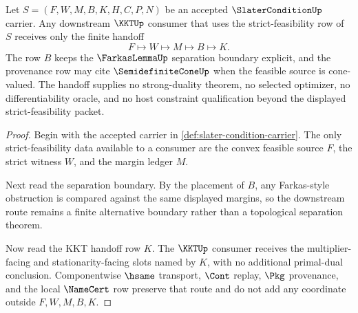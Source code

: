 \begin{theorem}
\label{thm:slater-condition-kkt-handoff}
Let $S=(F,W,M,B,K,H,C,P,N)$ be an accepted $\SlaterConditionUp$ carrier. Any downstream $\KKTUp$ consumer that uses the strict-feasibility row of $S$ receives only the finite handoff
$$
F\longmapsto W\longmapsto M\longmapsto B\longmapsto K .
$$
The row $B$ keeps the $\FarkasLemmaUp$ separation boundary explicit, and the provenance row may cite $\SemidefiniteConeUp$ when the feasible source is cone-valued. The handoff supplies no strong-duality theorem, no selected optimizer, no differentiability oracle, and no host constraint qualification beyond the displayed strict-feasibility packet.
\end{theorem}
\begin{proof}
Begin with the accepted carrier in \autoref{def:slater-condition-carrier}. The only strict-feasibility data available to a consumer are the convex feasible source $F$, the strict witness $W$, and the margin ledger $M$.

Next read the separation boundary. By the placement of $B$, any Farkas-style obstruction is compared against the same displayed margins, so the downstream route remains a finite alternative boundary rather than a topological separation theorem.

Now read the KKT handoff row $K$. The $\KKTUp$ consumer receives the multiplier-facing and stationarity-facing slots named by $K$, with no additional primal-dual conclusion. Componentwise $\hsame$ transport, $\Cont$ replay, $\Pkg$ provenance, and the local $\NameCert$ row preserve that route and do not add any coordinate outside $F,W,M,B,K$.
\end{proof}

\begin{closurestatus}{\SlaterConditionUp}
  \theoryclosure{\seedClosure}
  \formalstatus{\unformalizedV}
\end{closurestatus}
